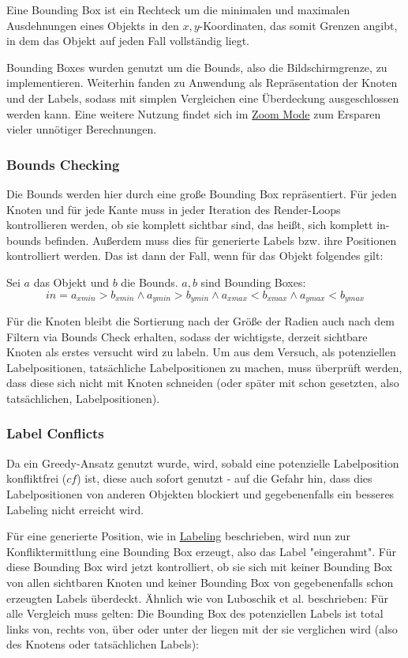 
Eine Bounding Box ist ein Rechteck um die minimalen und maximalen Ausdehnungen eines Objekts in den $x,y$-Koordinaten,
das somit Grenzen angibt, in dem das Objekt auf jeden Fall vollständig liegt.

Bounding Boxes wurden genutzt um die Bounds, also die Bildschirmgrenze, zu implementieren.
Weiterhin fanden zu Anwendung als Repräsentation der Knoten und der Labels, sodass mit simplen Vergleichen
eine Überdeckung ausgeschlossen werden kann.
Eine weitere Nutzung findet sich im \hyperref[subsec:zoom]{Zoom Mode} zum Ersparen vieler unnötiger Berechnungen.

\subsubsection{Bounds Checking}
Die Bounds werden hier durch eine große Bounding Box repräsentiert.
Für jeden Knoten und für jede Kante muss in jeder Iteration des
Render-Loops kontrollieren werden, ob sie komplett sichtbar sind, das heißt, sich komplett in-bounds befinden.
Außerdem muss dies für generierte Labels bzw. ihre Positionen kontrolliert werden.
Das ist dann der Fall, wenn für das Objekt folgendes gilt:

Sei $a$ das Objekt und $b$ die Bounds. $a,b$ sind Bounding Boxes:
$$in = a_{xmin} > b_{xmin} \wedge a_{ymin} > b_{ymin} \wedge a_{xmax} < b_{xmax} \wedge a_{ymax} < b_{ymax}$$


Für die Knoten bleibt die Sortierung nach der Größe der Radien auch nach dem Filtern via Bounds Check erhalten,
sodass der wichtigste, derzeit sichtbare Knoten als erstes versucht wird zu labeln.
Um aus dem Versuch, als potenziellen Labelpositionen, tatsächliche Labelpositionen zu machen, muss überprüft werden,
dass diese sich nicht mit Knoten schneiden (oder später mit schon gesetzten, also tatsächlichen, Labelpositionen).

\subsubsection{Label Conflicts}
\label{subsubsec:label_conflict}
Da ein Greedy-Ansatz genutzt wurde, wird, sobald eine potenzielle Labelposition konfliktfrei ($cf$) ist, diese auch sofort genutzt -
auf die Gefahr hin, dass dies Labelpositionen von anderen Objekten blockiert und gegebenenfalls ein besseres Labeling nicht erreicht wird.

Für eine generierte Position, wie in \hyperref[sec:labeling]{Labeling} beschrieben, wird nun zur Konfliktermittlung eine Bounding Box erzeugt, also das Label "eingerahmt".
Für diese Bounding Box wird jetzt kontrolliert, ob sie sich mit keiner Bounding Box von allen sichtbaren Knoten und keiner Bounding Box von gegebenenfalls schon erzeugten Labels überdeckt.
Ähnlich wie von Luboschik et al.\cite{main} beschrieben: Für alle Vergleich muss gelten: Die Bounding Box des potenziellen Labels ist total links von, rechts von, über oder unter der liegen mit der sie verglichen wird (also des Knotens oder tatsächlichen Labels):

